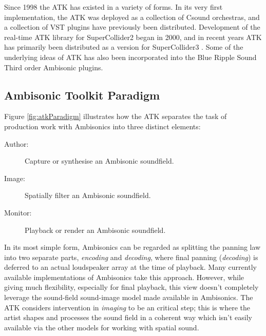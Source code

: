 \documentclass{article}
\begin{document}
Since 1998 the ATK has existed in a variety of forms.
In its very first implementation, the ATK was deployed as a collection of Csound orchestras, and a collection of VST plugins have previously been distributed.
Development of the real-time ATK library for SuperCollider2 began in 2000, and in recent years ATK has primarily been distributed as a version for SuperCollider3 \cite{Anderson:2009introducingATK}.
Some of the underlying ideas of ATK has also been incorporated into the Blue Ripple Sound Third order Ambisonic plugins.

\subsection{Ambisonic Toolkit Paradigm}\label{sec:atk-model}



Figure \ref{fig:atkParadigm} illustrates how the ATK separates the task of production work with Ambisonics into three distinct elements:

\begin{description}
  \item[Author:] Capture or synthesise an Ambisonic soundfield.
  \item[Image:] Spatially filter an Ambisonic soundfield.
  \item[Monitor:] Playback or render an Ambisonic soundfield.
\end{description}

In its most simple form, Ambisonics can be regarded as splitting the panning law into two separate parts, {\em encoding} and {\em decoding}, where final panning ({\em decoding}) is deferred to an actual loudspeaker array at the time of playback.
Many currently available implementations of Ambisonics take this approach. However, while giving much flexibility, especially for final playback, this view doesn't completely leverage the sound-field sound-image model made available in Ambisonics.
The ATK considers intervention in {\em imaging} to be an critical step; this is where the artist shapes and processes the sound field in a coherent way which isn't easily available via the other models for working with spatial sound.
\end{document}
